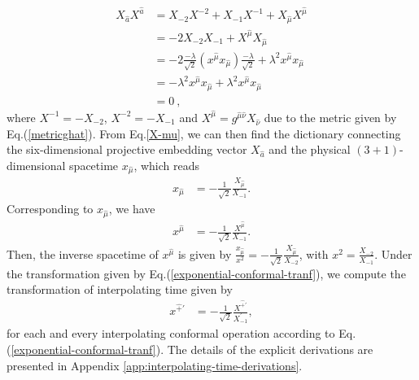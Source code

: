 \documentclass[foundations,article,submit,pdftex,moreauthors]{Definitions/mdpi}
\begin{document}
\begin{align}
    {X}_{\hat{a}}{X}^{\hat{a}}&={X}_{-2}{X}^{-2}+{X}_{-1}{X}^{-1}+{X}_{\hat{\mu}}{X}^{\hat{\mu}} \nonumber \\
    &=-2{X}_{-2}{X}_{-1}+{X}^{\hat{\mu}}{X}_{\hat{\mu}}\nonumber \\
     &=-2\frac{-\lambda}{\sqrt{2}}(x^{\hat{\mu}}x_{\hat{\mu}})\frac{-\lambda}{\sqrt{2}}+\lambda^2{x}^{\hat{\mu}}{x}_{\hat{\mu}}\nonumber \\
     &=-\lambda^2{x}^{\hat{\mu}}{x}_{\hat{\mu}}+\lambda^2{x}^{\hat{\mu}}{x}_{\hat{\mu}}\nonumber \\
     &=0~,
\end{align}
where ${X}^{-1}=-{X}_{-2}$, ${X}^{-2}=-{X}_{-1}$ and $X^{\hat \mu}=g^{\hat{\mu}\hat{\nu}}X_{\hat{\nu}}$ due to the metric
given by Eq.(\ref{metricghat}).
From Eq.\eqref{X-mu}, we can then find 
the dictionary connecting the six-dimensional projective embedding vector $X_{\hat{a}}$ and the physical $(3+1)$-dimensional spacetime $x_{\hat{\mu}}$, which reads
\begin{align}
    x_{\hat{\mu}}&=-\frac{1}{\sqrt{2}}\frac{{X}_{\hat{\mu}}}{ {X}_{-1}}.
\end{align}
Corresponding to $x_{\hat{\mu}}$, we have  
\begin{align}
    x^{\hat{\mu}}&=-\frac{1}{\sqrt{2}}\frac{{X}^{\hat{\mu}}}{ {X}_{-1}}.
\end{align}
Then, the inverse spacetime of $x^{\hat{\mu}}$ is given by $\frac{x_{\hat{\mu}}}{x^2}=-\frac{1}{\sqrt{2}}\frac{{X}_{\hat{\mu}}}{{X}_{-2}}$, with $x^2=\frac{{X}_{-2}}{{X}_{-1}}$. Under the transformation given by Eq.(\ref{exponential-conformal-tranf}), we compute the transformation of interpolating time given by
\begin{align}
    x^{\hat{+}\prime}&=-\frac{1}{\sqrt{2}}\frac{{X}^{\hat{+}\prime}}{ {X}^{\prime}_{-1}},
\end{align}
for each and every interpolating conformal operation according to Eq.(\ref{exponential-conformal-tranf}).
The details of the explicit derivations are presented in Appendix \ref{app:interpolating-time-derivations}.
\end{document}

